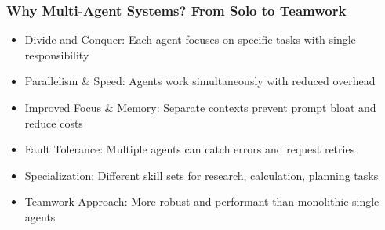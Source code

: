 \begin{frame}[fragile]\frametitle{Why Multi-Agent Systems? From Solo to Teamwork}
      \begin{itemize}
		\item Divide and Conquer: Each agent focuses on specific tasks with single responsibility
		\item Parallelism \& Speed: Agents work simultaneously with reduced overhead
		\item Improved Focus \& Memory: Separate contexts prevent prompt bloat and reduce costs
		\item Fault Tolerance: Multiple agents can catch errors and request retries
		\item Specialization: Different skill sets for research, calculation, planning tasks
		\item Teamwork Approach: More robust and performant than monolithic single agents
	  \end{itemize}
\end{frame}

